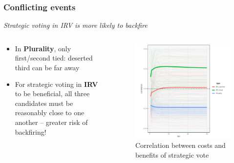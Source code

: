 \documentclass[10pt, en-GB]{beamer}
\begin{document}
\begin{frame}[t]\frametitle{Conflicting events}
    
\emph{Strategic voting in IRV is more likely to backfire}


\begin{columns}[T] %
\begin{column}{.48\textwidth}
\begin{itemize}
	\item In \textbf{Plurality}, only first/second tied: deserted third can be far away
	\item For strategic voting in \textbf{IRV} to be beneficial, all three candidates must be reasonably close to one another -- greater risk of backfiring!

\end{itemize}
\end{column}%
\hfill%
\begin{column}{.48\textwidth}
\begin{figure}[tb]
	\centering
	\includegraphics[width = \textwidth]{pres_fig/conj2.pdf}
	\caption{Correlation between costs and benefits of strategic vote}
	\label{fig:conj2}
\end{figure}

\end{column}%
\end{columns}

\end{frame}
\end{document}

